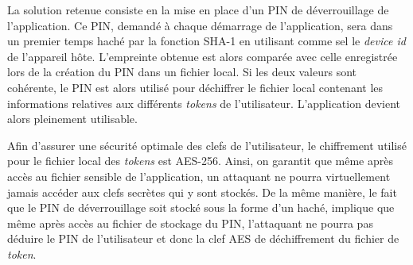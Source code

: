 La solution retenue consiste en la mise en place d'un PIN de déverrouillage de l'application.
Ce PIN, demandé à chaque démarrage de l'application, sera dans un premier temps haché par la
fonction SHA-1 en utilisant comme sel le \emph{device id} de l'appareil hôte. L'empreinte 
obtenue est alors comparée avec celle enregistrée lors de la création du PIN dans un fichier
local. Si les deux valeurs sont cohérente, le PIN est alors utilisé pour déchiffrer le
fichier local contenant les informations relatives aux différents \emph{tokens} de
l'utilisateur. L'application devient alors pleinement utilisable.

Afin d'assurer une sécurité optimale des clefs de l'utilisateur, le chiffrement utilisé pour
le fichier local des \emph{tokens} est AES-256. Ainsi, on garantit que même après accès au
fichier sensible de l'application, un attaquant ne pourra virtuellement jamais accéder aux
clefs secrètes qui y sont stockés. De la même manière, le fait que le PIN de déverrouillage
soit stocké sous la forme d'un haché, implique que même après accès au fichier de stockage du
PIN, l'attaquant ne pourra pas déduire le PIN de l'utilisateur et donc la clef AES de
déchiffrement du fichier de \emph{token}.




